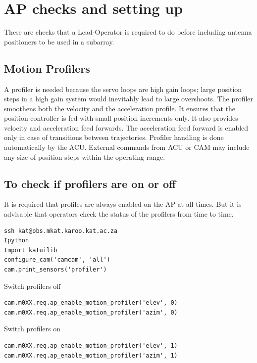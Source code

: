 \section{AP checks and setting up}


These are checks that a Lead-Operator is required to do before including antenna positioners to be used in a subarray. 
\subsection{ Motion Profilers}

A profiler is needed because the servo loops are high gain loops; large position steps in 
a high gain system would inevitably lead to large overshoots. The profiler smoothens both the velocity and the acceleration profile. It ensures that the position controller is fed with small position increments only. It also provides velocity and acceleration feed forwards. The acceleration feed forward is enabled only in case of transitions between trajectories. Profiler handling is done automatically by the ACU. External commands from ACU or CAM may include any size of position steps within the operating range.

\subsection{To check if profilers are on or off}
It is required that profiles are always enabled on the AP at all times. But it is advisable that operators check the status of the profilers from time to time. 
\begin{lstlisting}[style=DOS, tabsize=4]
ssh kat@obs.mkat.karoo.kat.ac.za
Ipython
Import katuilib
configure_cam('camcam', 'all')
cam.print_sensors('profiler')

\end{lstlisting}

Switch profilers off
\begin{lstlisting}[style=DOS]
cam.m0XX.req.ap_enable_motion_profiler('elev', 0)
cam.m0XX.req.ap_enable_motion_profiler('azim', 0)
\end{lstlisting}

Switch profilers on
\begin{lstlisting}[style=DOS]
cam.m0XX.req.ap_enable_motion_profiler('elev', 1)
cam.m0XX.req.ap_enable_motion_profiler('azim', 1)
\end{lstlisting}
